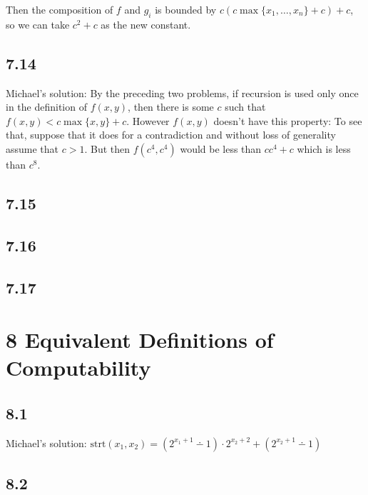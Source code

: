 \documentclass{article}
\newcommand\s{\section*}
\renewcommand\ss{\subsection*}
\newcommand\ms{Michael's solution: } %
\begin{document}
Then the composition of $f$ and $g_i$ is bounded by $c(c\max\{x_1,\ldots,x_n\} + c) + c$, so we
can take $c^2 + c$ as the new constant.
\ss{7.14}
\ms By the preceding two problems, if recursion is used only once in the definition of $f(x,y)$,
then there is some $c$ such that $f(x,y) < c \max\{x,y\} + c$.  However $f(x,y)$ doesn't
have this property:  To see that, suppose that it does for a contradiction and without loss of generality assume that $c > 1$.  But then $f(c^4,c^4)$ would be less than $c c^4 + c$ which is less than $c^8$.
\ss{7.15}
\ss{7.16}
\ss{7.17}

\s{8 Equivalent Definitions of Computability}
\ss{8.1}
\ms $\mathrm{strt}(x_1,x_2) = (2^{x_1+1}\dotminus 1)\cdot 2^{x_2+2}+(2^{x_2+1}\dotminus 1)$
\ss{8.2}
\end{document}
